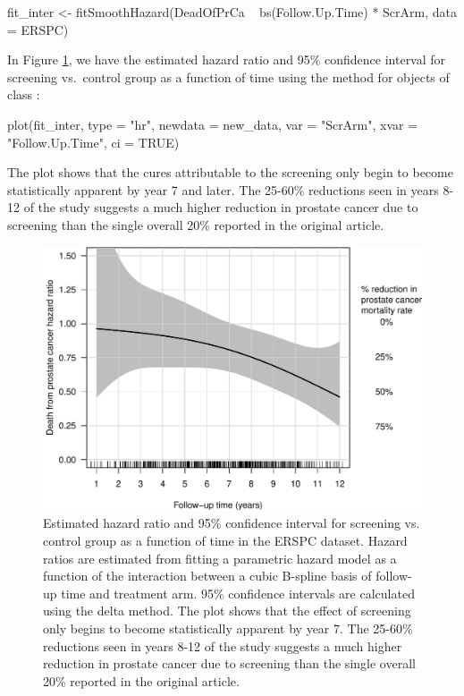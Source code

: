 \begin{Schunk}
\begin{Sinput}
fit_inter <- fitSmoothHazard(DeadOfPrCa ~ bs(Follow.Up.Time) * ScrArm, 
                             data = ERSPC)
\end{Sinput}
\end{Schunk}

In Figure \ref{fig:interaction-ERSPC}, we have the estimated hazard
ratio and 95\% confidence interval for screening vs.~control group as a
function of time using the  method for objects of class
:

\begin{Schunk}
\begin{Sinput}
plot(fit_inter, type = "hr", newdata = new_data,
     var = "ScrArm", xvar = "Follow.Up.Time", ci = TRUE)
\end{Sinput}
\end{Schunk}

The plot shows that the cures attributable to the screening only begin
to become statistically apparent by year 7 and later. The 25-60\%
reductions seen in years 8-12 of the study suggests a much higher
reduction in prostate cancer due to screening than the single overall
20\% reported in the original article.

\begin{Schunk}
\begin{figure}[ht]
\includegraphics[width=\textwidth,keepaspectratio=true]{../figures/interaction-ERSPC-1} \caption[Estimated hazard ratio and 95\% confidence interval for screening vs]{Estimated hazard ratio and 95\% confidence interval for screening vs. control group as a function of time in the ERSPC dataset. Hazard ratios are estimated from fitting a parametric hazard model as a function of the interaction between a cubic B-spline basis of follow-up time and treatment arm. 95\% confidence intervals are calculated using the delta method. The plot shows that the effect of screening only begins to become statistically apparent by year 7. The 25-60\% reductions seen in years 8-12 of the study suggests a much higher reduction in prostate cancer due to screening than the single overall 20\% reported in the original article.}\label{fig:interaction-ERSPC}
\end{figure}
\end{Schunk}

